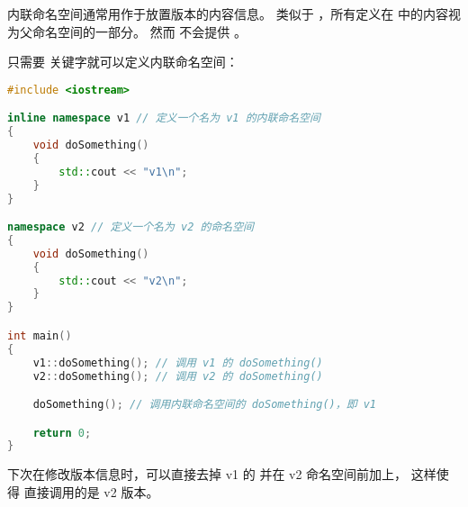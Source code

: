 \documentclass[../../LearnCpp.tex]{subfiles}
\begin{document}
内联命名空间通常用作于放置版本的内容信息。
类似于 ，所有定义在  中的内容视为父命名空间的一部分。
然而  不会提供 。

只需要  关键字就可以定义内联命名空间：

\begin{lstlisting}[language=C++]
#include <iostream>

inline namespace v1 // 定义一个名为 v1 的内联命名空间
{
    void doSomething()
    {
        std::cout << "v1\n";
    }
}

namespace v2 // 定义一个名为 v2 的命名空间
{
    void doSomething()
    {
        std::cout << "v2\n";
    }
}

int main()
{
    v1::doSomething(); // 调用 v1 的 doSomething()
    v2::doSomething(); // 调用 v2 的 doSomething()

    doSomething(); // 调用内联命名空间的 doSomething()，即 v1

    return 0;
}
\end{lstlisting}

下次在修改版本信息时，可以直接去掉 v1 的  并在 v2 命名空间前加上，
这样使得  直接调用的是 v2 版本。
\end{document}
